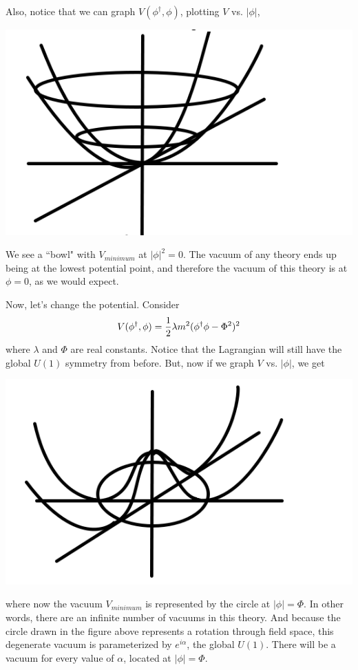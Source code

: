 \documentclass[12pt,epsf]{article}
\begin{document}
Also, notice that we can graph $V(\phi^{\dagger},\phi)$, plotting $V$
vs. $|\phi|$,
\begin{center}
\includegraphics[scale = .5]{truevacuum.png}
\end{center}
We see a ``bowl" with $V_{minimum}$ at $|\phi|^2 = 0$.	The vacuum of
any theory ends up being at the lowest potential point, and therefore
the vacuum of this theory is at $\phi=0$, as we would expect.  

Now, let's change the potential.  Consider 
\begin{eqnarray}
V(\phi^{\dagger},\phi) = {1\over 2}\lambda m^2 (\phi^{\dagger} \phi -
\Phi^2)^2 \label{eq:degeneratevacuum}
\end{eqnarray}
where $\lambda$ and $\Phi$ are real constants.	Notice that the
Lagrangian will still have the global $U(1)$ symmetry from before. 
But, now if we graph $V$ vs. $|\phi |$, we get 
\begin{center}
\includegraphics[scale = .5]{mexicanhat.png}
\end{center}
where now the vacuum $V_{minimum}$ is represented by the circle at
$|\phi | = \Phi$.  In other words, there are an infinite number of
vacuums in this theory.  And because the circle drawn in the figure
above represents a rotation through field space, this degenerate vacuum
is parameterized by $e^{i\alpha}$, the global $U(1)$.  There will be a
vacuum for every value of $\alpha$, located at $|\phi| = \Phi$.  
\end{document}
